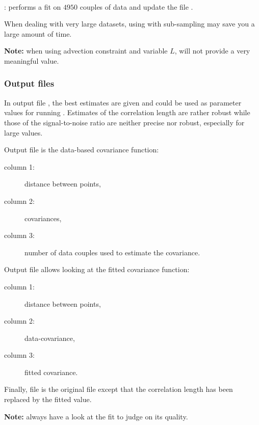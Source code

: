 \example\\
: performs a fit on $4950$ couples of data and update the file .

\btips
When dealing with very large datasets, using  with sub-sampling may save you a large amount of time.
\etips

\textbf{Note:} when using advection  constraint and variable $L$,  will not provide a very meaningful value.

\subsubsection{Output files}

In output file , the best estimates are given and could be used as parameter values for running \diva.
Estimates of the correlation length are rather robust while those of the signal-to-noise ratio are neither precise nor robust, especially for large values.

Output file  is the data-based covariance function:
\begin{description}
\item[column 1:] distance between points,
\item[column 2:] covariances, 
\item[column 3:] number of data couples used to estimate the covariance. 
\end{description} 

Output file  allows looking at the fitted covariance function:
\begin{description}
\item[column 1:] distance between points, 
\item[column 2:] data-covariance, 
\item[column 3:] fitted covariance.
\end{description} 

Finally, file  is the original  file except that the correlation length has been replaced by the fitted value. 

\textbf{Note:} always have a look at the fit to judge on its quality. %

\subsection{}

